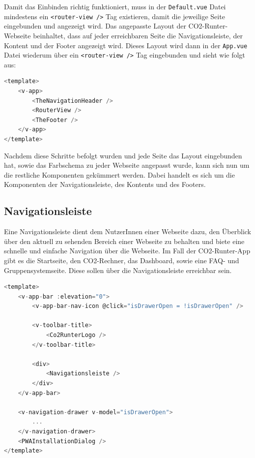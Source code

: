Damit das Einbinden richtig funktioniert, muss in der \texttt{Default.vue} Datei mindestens ein \texttt{<router-view />} Tag existieren, damit die jeweilige Seite eingebunden und angezeigt wird.
Das angepasste Layout der CO2-Runter-Webseite beinhaltet, dass auf jeder erreichbaren Seite die Navigationsleiste, der Kontent und der Footer angezeigt wird.
Dieses Layout wird dann in der \texttt{App.vue} Datei wiederum über ein \texttt{<router-view />} Tag eingebunden und sieht wie folgt aus:

\begin{lstlisting}[language={JavaScript}, caption={Layout Definition}]
<template>
    <v-app>
        <TheNavigationHeader />
        <RouterView />
        <TheFooter />
    </v-app>
</template>
\end{lstlisting}

Nachdem diese Schritte befolgt wurden und jede Seite das Layout eingebunden hat, sowie das Farbschema zu jeder Webseite angepasst wurde, kann sich nun um die restliche Komponenten gekümmert werden.
Dabei handelt es sich um die Komponenten der Navigationsleiste, des Kontents und des Footers.

\subsection{Navigationsleiste}

Eine Navigationsleiste dient dem NutzerInnen einer Webseite dazu, den Überblick über den aktuell zu sehenden Bereich einer Webseite zu behalten und biete eine schnelle und einfache Navigation über die Webseite.
Im Fall der CO2-Runter-App gibt es die Startseite, den CO2-Rechner, das Dashboard, sowie eine FAQ- und Gruppensystemseite.
Diese sollen über die Navigationsleiste erreichbar sein.

\begin{lstlisting}[language={JavaScript}, caption={Navigationsleiste für Web als auch Mobile}]
<template>
    <v-app-bar :elevation="0">
        <v-app-bar-nav-icon @click="isDrawerOpen = !isDrawerOpen" />

        <v-toolbar-title>
            <Co2RunterLogo />
        </v-toolbar-title>

        <div>
            <Navigationsleiste />
        </div>
    </v-app-bar>

    <v-navigation-drawer v-model="isDrawerOpen">
        ...
    </v-navigation-drawer>
    <PWAInstallationDialog />
</template>
\end{lstlisting}

